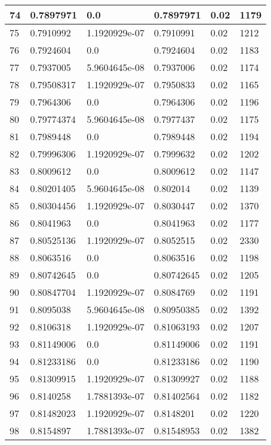 \begin{longtable}{|l|l|l|l|l|l|}
74 & 0.7897971 & 0.0 & 0.7897971 & 0.02 & 1179 \\ \hline 
75 & 0.7910992 & 1.1920929e-07 & 0.7910991 & 0.02 & 1212 \\ \hline 
76 & 0.7924604 & 0.0 & 0.7924604 & 0.02 & 1183 \\ \hline 
77 & 0.7937005 & 5.9604645e-08 & 0.7937006 & 0.02 & 1174 \\ \hline 
78 & 0.79508317 & 1.1920929e-07 & 0.7950833 & 0.02 & 1165 \\ \hline 
79 & 0.7964306 & 0.0 & 0.7964306 & 0.02 & 1196 \\ \hline 
80 & 0.79774374 & 5.9604645e-08 & 0.7977437 & 0.02 & 1175 \\ \hline 
81 & 0.7989448 & 0.0 & 0.7989448 & 0.02 & 1194 \\ \hline 
82 & 0.79996306 & 1.1920929e-07 & 0.7999632 & 0.02 & 1202 \\ \hline 
83 & 0.8009612 & 0.0 & 0.8009612 & 0.02 & 1147 \\ \hline 
84 & 0.80201405 & 5.9604645e-08 & 0.802014 & 0.02 & 1139 \\ \hline 
85 & 0.80304456 & 1.1920929e-07 & 0.8030447 & 0.02 & 1370 \\ \hline 
86 & 0.8041963 & 0.0 & 0.8041963 & 0.02 & 1177 \\ \hline 
87 & 0.80525136 & 1.1920929e-07 & 0.8052515 & 0.02 & 2330 \\ \hline 
88 & 0.8063516 & 0.0 & 0.8063516 & 0.02 & 1198 \\ \hline 
89 & 0.80742645 & 0.0 & 0.80742645 & 0.02 & 1205 \\ \hline 
90 & 0.80847704 & 1.1920929e-07 & 0.8084769 & 0.02 & 1191 \\ \hline 
91 & 0.8095038 & 5.9604645e-08 & 0.80950385 & 0.02 & 1392 \\ \hline 
92 & 0.8106318 & 1.1920929e-07 & 0.81063193 & 0.02 & 1207 \\ \hline 
93 & 0.81149006 & 0.0 & 0.81149006 & 0.02 & 1191 \\ \hline 
94 & 0.81233186 & 0.0 & 0.81233186 & 0.02 & 1190 \\ \hline 
95 & 0.81309915 & 1.1920929e-07 & 0.81309927 & 0.02 & 1188 \\ \hline 
96 & 0.8140258 & 1.7881393e-07 & 0.81402564 & 0.02 & 1182 \\ \hline 
97 & 0.81482023 & 1.1920929e-07 & 0.8148201 & 0.02 & 1220 \\ \hline 
98 & 0.8154897 & 1.7881393e-07 & 0.81548953 & 0.02 & 1382 \\ \hline 

\end{longtable}

